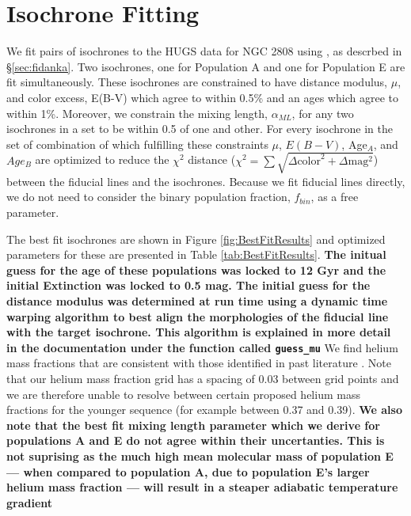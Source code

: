 \section{Isochrone Fitting}\label{sec:isoFit}
We fit pairs of isochrones to the HUGS data for NGC 2808 using \fidanka, as
descrbed in \S \ref{sec:fidanka}. Two isochrones, one for Population A and one
for Population E are fit simultaneously. These isochrones are constrained to
have distance modulus, $\mu$, and color excess, E(B-V) which agree to within
0.5\% and an ages which agree to within 1\%. Moreover, we constrain the mixing length, $\alpha_{ML}$, for any two
isochrones in a set to be within 0.5 of one and other. For every isochrone in
the set of combination of which fulfilling these constraints $\mu$, $E(B-V)$,
Age$_{A}$, and $Age_{B}$ are optimized to reduce the $\chi^{2}$ distance
($\chi^{2} = \sum\sqrt{\Delta \text{color}^{2} + \Delta \text{mag} ^{2}}$)
between the fiducial lines and the isochrones. Because we fit fiducial lines
directly, we do not need to consider the binary population fraction, $f_{bin}$,
as a free parameter.

The best fit isochrones are shown in Figure \ref{fig:BestFitResults} and
optimized parameters for these are presented in Table \ref{tab:BestFitResults}.
{\bf The initual guess for the age of these populations was locked to 12 Gyr
and the initial Extinction was locked to 0.5 mag. The initial guess for the
distance modulus was determined at run time using a dynamic time warping
algorithm to best align the morphologies of the fiducial line with the target
isochrone. This algorithm is explained in more detail in the \fidanka
documentation under the function called \texttt{guess\_mu}} We find helium mass
fractions that are consistent with those identified in past literature
\citep[e.g.][]{Milone2015}. Note that our helium mass fraction grid has a
spacing of 0.03 between grid points and we are therefore unable to resolve
between certain proposed helium mass fractions for the younger sequence (for
example between 0.37 and 0.39). {\bf We also note that the best fit mixing
length parameter which we derive for populations A and E do not agree within
their uncertanties. This is not suprising as the much high mean molecular mass
of population E --- when compared to population A, due to population E's larger
helium mass fraction --- will result in a steaper adiabatic temperature
gradient} 

